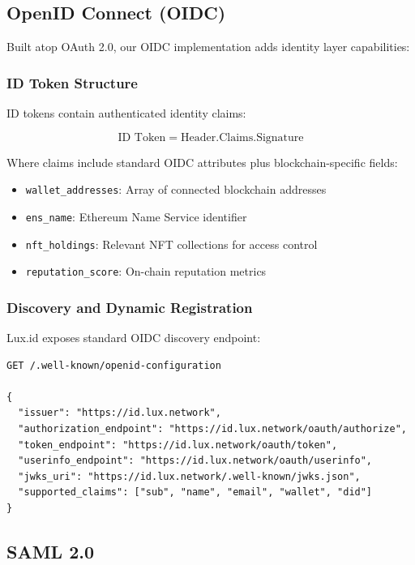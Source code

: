 \documentclass[11pt,a4paper]{article}
\begin{document}
\subsection{OpenID Connect (OIDC)}

Built atop OAuth 2.0, our OIDC implementation adds identity layer capabilities:

\subsubsection{ID Token Structure}

ID tokens contain authenticated identity claims:

\begin{equation}
    \text{ID Token} = \text{Header}.\text{Claims}.\text{Signature}
\end{equation}

Where claims include standard OIDC attributes plus blockchain-specific fields:

\begin{itemize}
    \item \texttt{wallet\_addresses}: Array of connected blockchain addresses
    \item \texttt{ens\_name}: Ethereum Name Service identifier
    \item \texttt{nft\_holdings}: Relevant NFT collections for access control
    \item \texttt{reputation\_score}: On-chain reputation metrics
\end{itemize}

\subsubsection{Discovery and Dynamic Registration}

Lux.id exposes standard OIDC discovery endpoint:

\begin{lstlisting}
GET /.well-known/openid-configuration

{
  "issuer": "https://id.lux.network",
  "authorization_endpoint": "https://id.lux.network/oauth/authorize",
  "token_endpoint": "https://id.lux.network/oauth/token",
  "userinfo_endpoint": "https://id.lux.network/oauth/userinfo",
  "jwks_uri": "https://id.lux.network/.well-known/jwks.json",
  "supported_claims": ["sub", "name", "email", "wallet", "did"]
}
\end{lstlisting}

\subsection{SAML 2.0}
\end{document}
